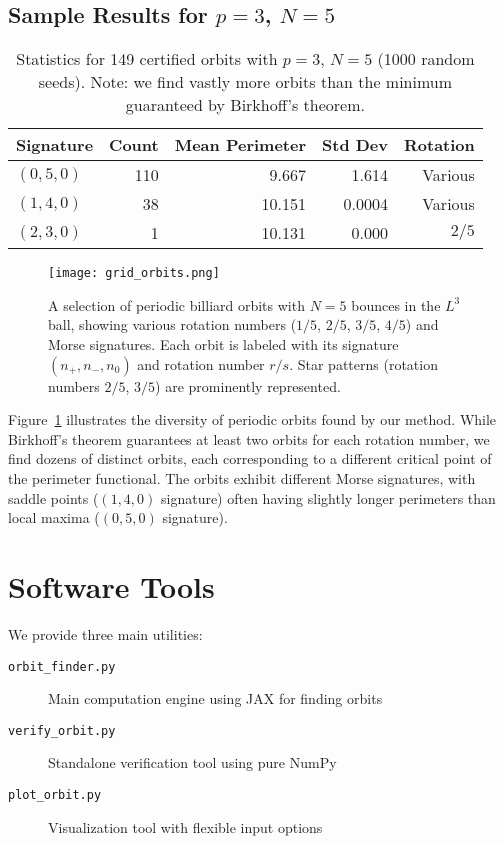\documentclass[11pt]{article}
\theoremstyle{plain}
\theoremstyle{definition}
\theoremstyle{remark}
\begin{document}
\subsection{Sample Results for $p = 3$, $N = 5$}

\begin{table}[h]
\centering
\begin{tabular}{@{}lrrrr@{}}
\toprule
Signature & Count & Mean Perimeter & Std Dev & Rotation \\
\midrule
$(0,5,0)$ & 110 & 9.667 & 1.614 & Various \\
$(1,4,0)$ & 38 & 10.151 & 0.0004 & Various \\
$(2,3,0)$ & 1 & 10.131 & 0.000 & $2/5$ \\
\bottomrule
\end{tabular}
\caption{Statistics for 149 certified orbits with $p = 3$, $N = 5$ (1000 random seeds). Note: we find vastly more orbits than the minimum guaranteed by Birkhoff's theorem.}
\end{table}

\begin{figure}[h]
\centering
\texttt{[image: grid\_orbits.png]}
\caption{A selection of periodic billiard orbits with $N=5$ bounces in the $L^3$ ball, showing various rotation numbers ($1/5$, $2/5$, $3/5$, $4/5$) and Morse signatures. Each orbit is labeled with its signature $(n_+, n_-, n_0)$ and rotation number $r/s$. Star patterns (rotation numbers $2/5$, $3/5$) are prominently represented.}
\label{fig:grid_orbits}
\end{figure}

Figure~\ref{fig:grid_orbits} illustrates the diversity of periodic orbits found by our method. While Birkhoff's theorem guarantees at least two orbits for each rotation number, we find dozens of distinct orbits, each corresponding to a different critical point of the perimeter functional. The orbits exhibit different Morse signatures, with saddle points ($(1,4,0)$ signature) often having slightly longer perimeters than local maxima ($(0,5,0)$ signature).

\section{Software Tools}

We provide three main utilities:

\begin{description}
\item[\texttt{orbit\_finder.py}] Main computation engine using JAX for finding orbits
\item[\texttt{verify\_orbit.py}] Standalone verification tool using pure NumPy
\item[\texttt{plot\_orbit.py}] Visualization tool with flexible input options
\end{description}
\end{document}
